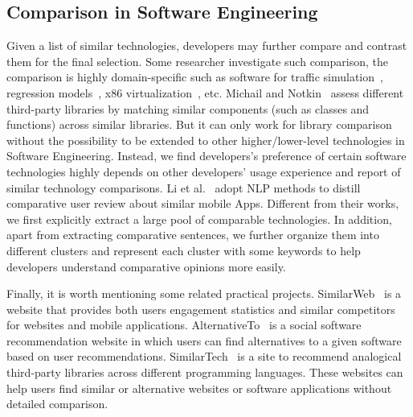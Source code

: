 \subsection{Comparison in Software Engineering}
Given a list of similar technologies, developers may further compare and contrast them for the final selection.
Some researcher investigate such comparison, the comparison is highly domain-specific such as software for traffic simulation~\cite{jones2004traffic}, regression models~\cite{horton2001multiple}, x86 virtualization~\cite{adams2006comparison}, etc.
Michail and Notkin~\cite{michail1999assessing} assess different third-party libraries by matching similar components (such as classes and functions) across similar libraries.
But it can only work for library comparison without the possibility to be extended to other higher/lower-level technologies in Software Engineering.
Instead, we find developers's preference of certain software technologies highly depends on other developers' usage experience and report of similar technology comparisons.
Li et al.~\cite{li2017mining} adopt NLP methods to distill comparative user review about similar mobile Apps.
Different from their works, we first explicitly extract a large pool of comparable technologies.
In addition, apart from extracting comparative sentences, we further organize them into different clusters and represent each cluster with some keywords to help developers understand comparative opinions more easily.

Finally, it is worth mentioning some related practical projects. 
SimilarWeb~\cite{web:similarweb} is a website that provides both users engagement statistics and similar competitors for websites and mobile applications. 
AlternativeTo~\cite{web:alternativeto} is a social software recommendation website in which users can find alternatives to a given software based on user recommendations. 
SimilarTech~\cite{web:similartechgraph} is a site to recommend analogical third-party libraries across different programming languages.
These websites can help users find similar or alternative websites or software applications without detailed comparison.  